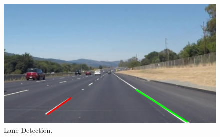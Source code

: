 \documentclass[11pt]{article}
\begin{document}
\begin{description}
\begin{figure}[H]
  \centering
	\includegraphics[height=0.4\textwidth]{Q2_main}
	\caption{Lane Detection.} 
\end{figure}

\end{description}
\end{document}
